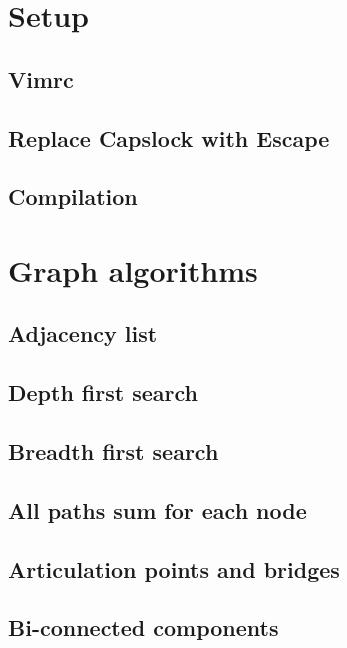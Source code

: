 \section{Setup}
\subsection{Vimrc}
\raggedbottom
\hrulefill
\subsection{Replace Capslock with Escape}
\raggedbottom
\hrulefill
\subsection{Compilation}
\raggedbottom
\hrulefill


\section{Graph algorithms}
\subsection{Adjacency list}
\raggedbottom
\hrulefill
\subsection{Depth first search}
\raggedbottom
\hrulefill
\subsection{Breadth first search}
\raggedbottom
\hrulefill
\subsection{All paths sum for each node}
\raggedbottom
\hrulefill
\subsection{Articulation points and bridges}
\raggedbottom
\hrulefill
\subsection{Bi-connected components}
\raggedbottom
\hrulefill
